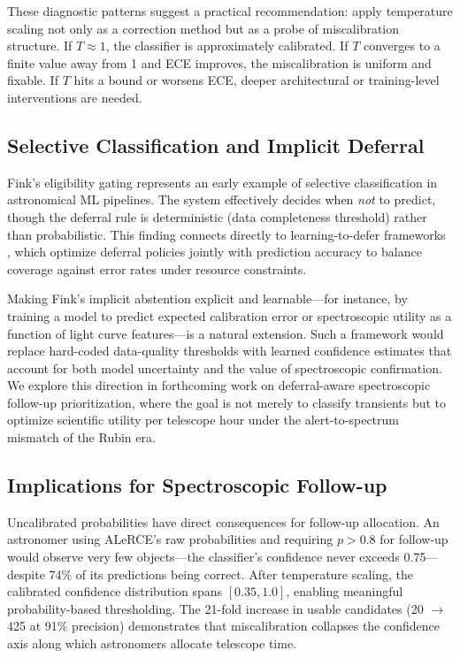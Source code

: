 \documentclass[twocolumn]{aastex631}
\begin{document}
These diagnostic patterns suggest a practical recommendation: apply temperature scaling not only as a correction method but as a probe of miscalibration structure. If $T \approx 1$, the classifier is approximately calibrated. If $T$ converges to a finite value away from 1 and ECE improves, the miscalibration is uniform and fixable. If $T$ hits a bound or worsens ECE, deeper architectural or training-level interventions are needed.

\subsection{Selective Classification and Implicit Deferral}

Fink's eligibility gating represents an early example of selective classification in astronomical ML pipelines. The system effectively decides when \emph{not} to predict, though the deferral rule is deterministic (data completeness threshold) rather than probabilistic. This finding connects directly to learning-to-defer frameworks \citep{mozannar2020,madras2018}, which optimize deferral policies jointly with prediction accuracy to balance coverage against error rates under resource constraints.

Making Fink's implicit abstention explicit and learnable---for instance, by training a model to predict expected calibration error or spectroscopic utility as a function of light curve features---is a natural extension. Such a framework would replace hard-coded data-quality thresholds with learned confidence estimates that account for both model uncertainty and the value of spectroscopic confirmation. We explore this direction in forthcoming work on deferral-aware spectroscopic follow-up prioritization, where the goal is not merely to classify transients but to optimize scientific utility per telescope hour under the alert-to-spectrum mismatch of the Rubin era.

\subsection{Implications for Spectroscopic Follow-up}

Uncalibrated probabilities have direct consequences for follow-up allocation. An astronomer using ALeRCE's raw probabilities and requiring $p > 0.8$ for follow-up would observe very few objects---the classifier's confidence never exceeds 0.75---despite 74\% of its predictions being correct. After temperature scaling, the calibrated confidence distribution spans $[0.35, 1.0]$, enabling meaningful probability-based thresholding. The 21-fold increase in usable candidates (20 $\to$ 425 at 91\% precision) demonstrates that miscalibration collapses the confidence axis along which astronomers allocate telescope time.
\end{document}
